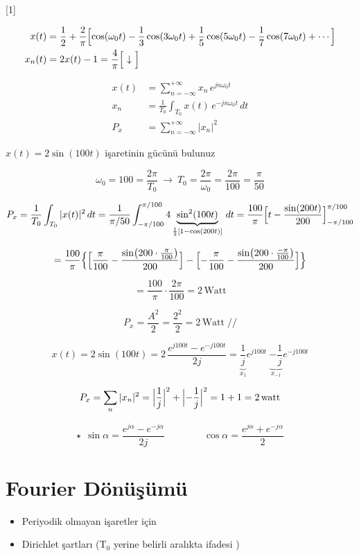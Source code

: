 \documentclass[11pt,a4paper]{article}
\begin{document}

[1]

\begin{align*}
x(t)&=\frac12+\frac{2}{\pi}\Bigl[\cos(\omega_0 t)-\frac13\cos(3\omega_0 t)+\frac15\cos(5\omega_0 t)-\frac17\cos(7\omega_0 t)+\cdots\Bigr]\\
x_n(t)&=2x(t)-1=\frac{4}{\pi}\Bigl[\ \downarrow\ \Bigr]
\end{align*}

\begin{align*}
x(t)&=\sum_{n=-\infty}^{+\infty} x_n\, e^{jn\omega_0 t}\\
x_n&=\frac{1}{T_0}\int_{T_0} x(t)\,e^{-jn\omega_0 t}\,dt\\
P_x&=\sum_{n=-\infty}^{+\infty}|x_n|^2
\end{align*}

\begin{ornek}
$x(t)=2\sin(100t)$ işaretinin gücünü bulunuz
\end{ornek}

\[
\omega_0=100=\frac{2\pi}{T_0}\ \to\ T_0=\frac{2\pi}{\omega_0}=\frac{2\pi}{100}=\frac{\pi}{50}
\]

\[
P_x=\frac{1}{T_0}\int_{T_0}|x(t)|^2\,dt=\frac{1}{\pi/50}\int_{-\pi/100}^{\pi/100}4\underbrace{\sin^2(100t)}_{\frac12[1-\cos(200t)]}\,dt=\frac{100}{\pi}\Bigl[t-\frac{\sin(200t)}{200}\Bigr]_{-\pi/100}^{\pi/100}
\]

\[
=\frac{100}{\pi}\Bigl\{\Bigl[\frac{\pi}{100}-\frac{\sin\bigl(200\cdot\frac{\pi}{100}\bigr)}{200}\Bigr]-\Bigl[-\frac{\pi}{100}-\frac{\sin\bigl(200\cdot\frac{-\pi}{100}\bigr)}{200}\Bigr]\Bigr\}
\]

\[
=\frac{100}{\pi}\cdot\frac{2\pi}{100}=2\,\mathrm{Watt}
\]

\[
P_x=\frac{A^2}{2}=\frac{2^2}{2}=2\,\mathrm{Watt}\;/\!/
\]

\[
x(t)=2\sin(100t)=2\,\frac{e^{j100t}-e^{-j100t}}{2j}=\underbrace{\frac1j}_{x_1}e^{j100t}\ \underbrace{-\frac1j}_{x_{-1}}e^{-j100t}
\]

\[
P_x=\sum_n|x_n|^2=\Bigl|\frac1j\Bigr|^2+\Bigl|-\frac1j\Bigr|^2=1+1=2\,\mathrm{watt}
\]

\[ \star\ \ \sin\alpha=\frac{e^{j\alpha}-e^{-j\alpha}}{2j}\qquad\qquad \cos\alpha=\frac{e^{j\alpha}+e^{-j\alpha}}{2} \]

\section{Fourier Dönüşümü}
\begin{itemize}
\item Periyodik olmayan işaretler için
\item Dirichlet şartları (T$_0$ yerine belirli aralıkta ifadesi )
\end{itemize}
\end{document}
